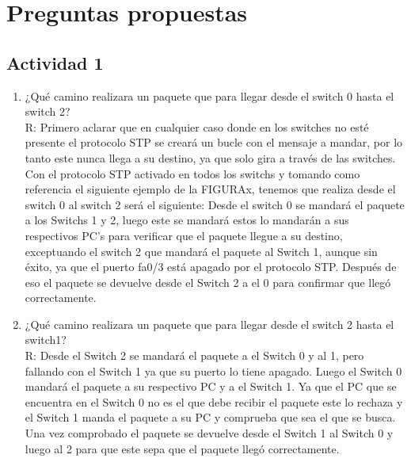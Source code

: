 \documentclass[onecolumn,11pts]{IEEEtran}
\begin{document}
\newpage
\section{Preguntas propuestas}
\subsection{Actividad 1}
\begin{enumerate}
    \item ¿Qué camino realizara un paquete que para llegar desde el switch 0 hasta el switch 2?\\
R: Primero aclarar que en cualquier caso donde en los switches no esté presente el protocolo STP se creará un bucle con el mensaje a mandar, por lo tanto este nunca llega a su destino, ya que solo gira a través de las switches.
Con el protocolo STP activado en todos los switchs y tomando como referencia el siguiente ejemplo de la FIGURAx, tenemos que realiza desde el switch 0 al switch 2 será el siguiente: Desde el switch 0 se mandará el paquete a los Switchs 1 y 2, luego este se mandará estos lo mandarán a sus respectivos PC’s para verificar que el paquete llegue a su destino, exceptuando el switch 2 que mandará el paquete al Switch 1, aunque sin éxito, ya que el puerto fa0/3 está apagado por el protocolo STP. Después de eso el paquete se devuelve desde el Switch 2 a el 0 para confirmar que llegó correctamente.\\

    \item ¿Qué camino realizara un paquete que para llegar desde el switch 2 hasta el switch1?\\
R: Desde el Switch 2 se mandará el paquete a el Switch 0 y al 1, pero fallando con el Switch 1 ya que su puerto lo tiene apagado. Luego el Switch 0 mandará el paquete a su respectivo PC y a el Switch 1. Ya que el PC que se encuentra en el Switch 0 no es el que debe recibir el paquete este lo rechaza y el Switch 1 manda el paquete a su PC y comprueba que sea el que se busca. Una vez comprobado el paquete se devuelve desde el Switch 1 al Switch 0 y luego al 2 para que este sepa que el paquete llegó correctamente.\\


\end{enumerate}
\end{document}
